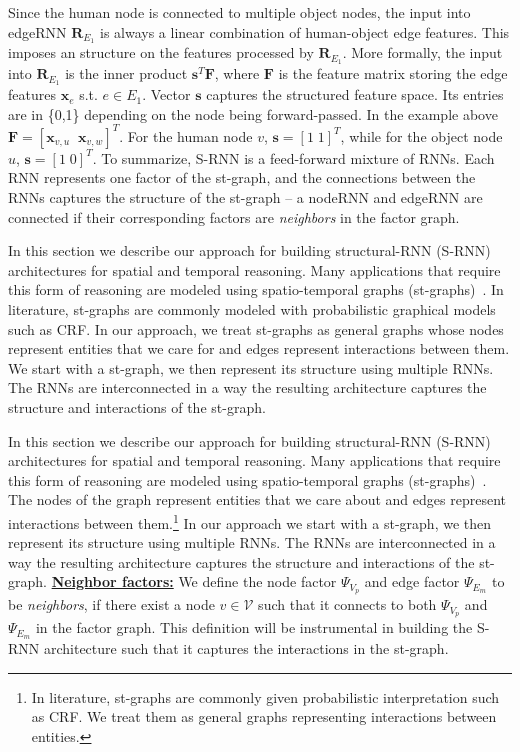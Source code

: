 \documentclass[10pt,twocolumn,letterpaper]{article}
\newcommand{\ve}[1]{\mathbf{#1}}
\newcommand{\mcal}[1]{\mathcal{#1}}
\begin{document}
Since the human node is connected to multiple object nodes, the input into edgeRNN $\ve{R}_{E_1}$ is always a linear combination of  human-object edge features. This imposes an structure on the features processed by $\ve{R}_{E_1}$. More formally, the input into $\ve{R}_{E_1}$ is the inner product $\ve{s}^T\ve{F}$, where $\ve{F}$ is the feature matrix storing the edge features $\ve{x}_e$ s.t. $e \in E_1$. Vector $\ve{s}$ captures  the structured feature space. Its entries are in \{0,1\} depending on the node being forward-passed. In the example above $\ve{F} = [\ve{x}_{v,u}\;\; \ve{x}_{v,w}]^T$. For the human node $v$, $\ve{s}=[1\; 1]^T$, while for the object node $u$, $\ve{s}=[1\; 0]^T$.
To summarize, S-RNN is a feed-forward  mixture of RNNs. Each RNN represents one factor of the st-graph, and the connections between the RNNs captures the structure of the st-graph -- a nodeRNN and edgeRNN are connected if their corresponding factors are \textit{neighbors} in the factor graph.%

In this section we describe our approach for building structural-RNN (S-RNN) architectures for spatial and temporal reasoning. Many applications that  require this form of reasoning are modeled using spatio-temporal graphs (st-graphs)~\cite{X}. In literature, st-graphs are commonly modeled with probabilistic graphical models such as CRF. In our approach, we treat st-graphs as general graphs whose nodes represent entities that we care for and edges represent interactions between them. We start with a st-graph, we then represent its structure using multiple RNNs. The RNNs are interconnected in a way the resulting architecture captures the structure and interactions of the st-graph. 

In this section we describe our approach for building structural-RNN (S-RNN) architectures for spatial and temporal reasoning. Many applications that  require this form of reasoning are modeled using spatio-temporal graphs (st-graphs)~\cite{X}. The nodes of the graph represent entities that we care about and edges represent interactions between them.\footnote{In literature, st-graphs are commonly given probabilistic interpretation such as CRF. We treat them as general graphs representing interactions between entities.} In our approach we start with a st-graph, we then represent its structure using multiple RNNs. The RNNs are interconnected in a way the resulting architecture captures the structure and interactions of the st-graph. 
\fi\iffalse\noindent\textbf{\underline{Neighbor factors:}} We define the node factor $\Psi_{V_p}$ and edge factor $\Psi_{E_m}$ to be \textit{neighbors}, if there exist a node $v \in \mcal{V}$ such that it connects to both $\Psi_{V_p}$ and $\Psi_{E_m}$ in the factor graph. This definition will be instrumental in building the S-RNN architecture such that it captures the interactions in the st-graph.
\end{document}
